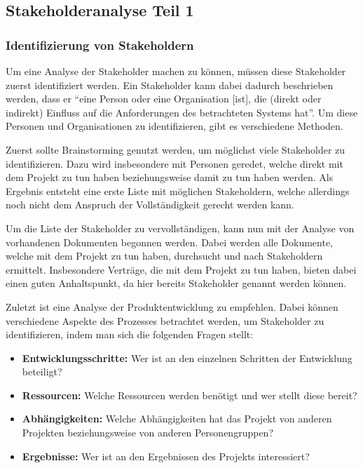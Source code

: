 
\subsection{Stakeholderanalyse Teil 1}\label{sec:stakeholderanalyse-teil-1}
\subsubsection{Identifizierung von Stakeholdern}
Um eine Analyse der Stakeholder machen zu können, müssen diese Stakeholder zuerst identifiziert werden.
Ein Stakeholder kann dabei dadurch beschrieben werden, dass er ``eine Person oder eine Organisation [ist], die (direkt oder indirekt) Einfluss auf die Anforderungen des betrachteten Systems hat''\autocite[Seite 8]{Maulhardt.a}.
Um diese Personen und Organisationen zu identifizieren, gibt es verschiedene Methoden.

Zuerst sollte Brainstorming genutzt werden, um möglichst viele Stakeholder zu identifizieren.
Dazu wird insbesondere mit Personen geredet, welche direkt mit dem Projekt zu tun haben beziehungsweise damit zu tun haben werden.
Als Ergebnis entsteht eine erste Liste mit möglichen Stakeholdern, welche allerdings noch nicht dem Anspruch der Vollständigkeit gerecht werden kann.

Um die Liste der Stakeholder zu vervollständigen, kann nun mit der Analyse von vorhandenen Dokumenten begonnen werden.
Dabei werden alle Dokumente, welche mit dem Projekt zu tun haben, durchsucht und nach Stakeholdern ermittelt.
Insbesondere Verträge, die mit dem Projekt zu tun haben, bieten dabei einen guten Anhaltspunkt, da hier bereits Stakeholder genannt werden können.

Zuletzt ist eine Analyse der Produktentwicklung zu empfehlen.
Dabei können verschiedene Aspekte des Prozesses betrachtet werden, um Stakeholder zu identifizieren, indem man sich die folgenden Fragen stellt:

\begin{itemize}
    \item \textbf{Entwicklungsschritte:} Wer ist an den einzelnen Schritten der Entwicklung beteiligt?
    \item \textbf{Ressourcen:} Welche Ressourcen werden benötigt und wer stellt diese bereit?
    \item \textbf{Abhängigkeiten:} Welche Abhängigkeiten hat das Projekt von anderen Projekten beziehungsweise von anderen Personengruppen?
    \item \textbf{Ergebnisse:} Wer ist an den Ergebnissen des Projekts interessiert?
\end{itemize}

